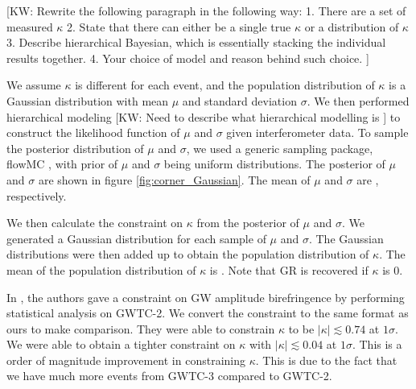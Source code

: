 \documentclass[aps,prd,twocolumn,superscriptaddress,preprintnumbers,floatfix,nofootinbib]{revtex4-2}
\newcommand{\kw}[1]{{\color{rb4}[KW: #1 ]}}
\begin{document}
\kw{Rewrite the following paragraph in the following way:
1. There are a set of measured $\kappa$
2. State that there can either be a single true $\kappa$ or a distribution of $\kappa$
3. Describe hierarchical Bayesian, which is essentially stacking the individual results together.
4. Your choice of model and reason behind such choice.} 





We assume $\kappa$ is different for each event, and the population distribution of $\kappa$ is a Gaussian distribution with mean $\mu$ and standard deviation $\sigma$.
We then performed hierarchical modeling
\kw{Need to describe what hierarchical modelling is}
to construct the likelihood function of $\mu$ and $\sigma$ given interferometer data.
To sample the posterior distribution of $\mu$ and $\sigma$, we used a generic sampling package, flowMC \citep{flowMC}, with prior of $\mu$ and $\sigma$ being uniform distributions.
The posterior of $\mu$ and $\sigma$ are shown in figure \ref{fig:corner_Gaussian}.
The mean of $\mu$ and $\sigma$ are , respectively.


We then calculate the constraint on $\kappa$ from the posterior of $\mu$ and $\sigma$.
We generated a Gaussian distribution for each sample of $\mu$ and $\sigma$.
The Gaussian distributions were then added up to obtain the population distribution of $\kappa$.
The mean of the population distribution of $\kappa$ is .
Note that GR is recovered if $\kappa$ is $0$.

In \citet{Okounkova_2022}, the authors gave a constraint on GW amplitude birefringence by performing statistical analysis on GWTC-2.
We convert the constraint to the same format as ours to make comparison.
They were able to constrain $\kappa$ to be $|\kappa| \lesssim 0.74$ at $1 \sigma$.
We were able to obtain a tighter constraint on $\kappa$ with $|\kappa| \lesssim 0.04$ at $1 \sigma$.
This is a order of magnitude improvement in constraining $\kappa$.
This is due to the fact that we have much more events from GWTC-3 compared to GWTC-2.
\end{document}
